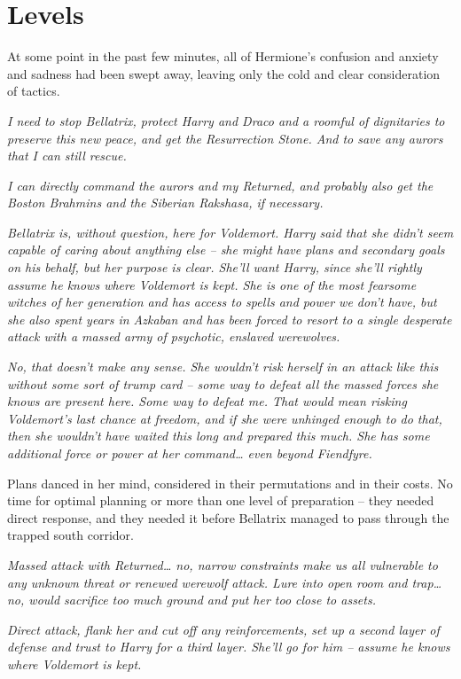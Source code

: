 \hypertarget{levels}{%
\chapter{Levels}\label{levels}}

At some point in the past few minutes, all of Hermione's confusion and
anxiety and sadness had been swept away, leaving only the cold and clear
consideration of tactics.

\emph{I need to stop Bellatrix, protect Harry and Draco and a roomful of
dignitaries to preserve this new peace, and get the Resurrection Stone.
And to save any aurors that I can still rescue.}

\emph{I can directly command the aurors and my Returned, and probably
also get the Boston Brahmins and the Siberian Rakshasa, if necessary.}

\emph{Bellatrix is, without question, here for Voldemort. Harry said
that she didn't seem capable of caring about anything else -- she might
have plans and secondary goals on his behalf, but her purpose is clear.
She'll want Harry, since she'll rightly assume he knows where Voldemort
is kept. She is one of the most fearsome witches of her generation and
has access to spells and power we don't have, but she also spent years
in Azkaban and has been forced to resort to a single desperate attack
with a massed army of psychotic, enslaved werewolves.}

\emph{No, that doesn't make any sense. She wouldn't risk herself in an
attack like this without some sort of trump card -- some way to defeat
all the massed forces she knows are present here. Some way to defeat me.
That would mean risking Voldemort's last chance at freedom, and if she
were unhinged enough to do that, then she wouldn't have waited this long
and prepared this much. She has some additional force or power at her
command\ldots{} even beyond Fiendfyre.}

Plans danced in her mind, considered in their permutations and in their
costs. No time for optimal planning or more than one level of
preparation -- they needed direct response, and they needed it before
Bellatrix managed to pass through the trapped south corridor.

\emph{Massed attack with Returned\ldots{} no, narrow constraints make us
all vulnerable to any unknown threat or renewed werewolf attack. Lure
into open room and trap\ldots{} no, would sacrifice too much ground and
put her too close to assets.}

\emph{Direct attack, flank her and cut off any reinforcements, set up a
second layer of defense and trust to Harry for a third layer. She'll go
for him -- assume he knows where Voldemort is kept.}

